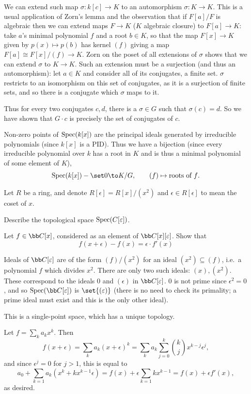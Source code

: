 We can extend such map $\sigma\colon k[c]\to K$ to an automorphism $\sigma\colon K\to K$.
This is a usual application of Zorn's lemma and the observation that if $F[a]/F$ is algebraic then we can extend maps
$F\to K$ ($K$ algebraic closure) to $F[a]\to K$: take $a$'s minimal polynomial $f$ and a root $b\in K$, so that
the map $F[x]\to K$ given by $p(x)\mapsto p(b)$ has kernel $(f)$ giving a map $F[a]\cong F[x]/(f)\to K$.
Zorn on the poset of all extensions of $\sigma$ shows that we can extend $\sigma$ to $K\to K$.
Such an extension must be a surjection (and thus an automorphism): let $a\in K$ and consider all of its conjugates,
a finite set.
$\sigma$ restricts to an isomorphism on this set of conjugates, as it is a surjection of finite sets, and so there is a
conjugate which $\sigma$ maps to it.

Thus for every two conjugates $c,d$, there is a $\sigma\in G$ such that $\sigma(c)=d$.
So we have shown that $G\cdot c$ is precisely the set of conjugates of $c$.

Non-zero points of ${\rm Spec}(k[x])$ are the principal ideals generated by irreducible polynomials (since $k[x]$ is a PID).
Thus we have a bijection (since every irreducible polynomial over $k$ has a root in $K$ and is thus a minimal polynomial
of some element of $K$),
$$ \spec(k[x])-\set0 \to K/G,\qquad (f)\mapsto\hbox{roots of $f$} . $$

\bprob

    Let $R$ be a ring, and denote $R[\epsilon]=R[x]/(x^2)$ and $\epsilon\in R[\epsilon]$ to mean the coset of $x$.
    \benum
        \item Describe the topological space ${\rm Spec}(C[\varepsilon])$.
        \item Let $f\in\bC[x]$, considered as an element of $\bC[x][\epsilon]$.
        Show that
        $$ f(x+\epsilon) - f(x) = \epsilon\cdot f'(x) $$
    \eenum

\eprob

\benum
    \item Ideals of $\bC[\epsilon]$ are of the form $(f)/(x^2)$ for an ideal $(x^2)\subseteq(f)$, i.e.\ a polynomial
    $f$ which divides $x^2$.
    There are only two such ideals: $(x),(x^2)$.
    These correspond to the ideals $0$ and $(\epsilon)$ in $\bC[\epsilon]$.
    $0$ is not prime since $\epsilon^2=0$, and so $\spec(\bC[\epsilon])$ is $\set{(\epsilon)}$ (there is no need to check
    its primality; a prime ideal must exist and this is the only other ideal).

    This is a single-point space, which has a unique topology.

    \item Let $f=\sum_ka_kx^k$.
    Then
    $$ f(x+\epsilon) = \sum_k a_k(x+\epsilon)^k = \sum_k a_k\sum_{j=0}^k\binom kj x^{k-j}\epsilon^j , $$
    and since $\epsilon^j=0$ for $j>1$, this is equal to
    $$ a_0 + \sum_{k=1}a_k(x^k+kx^{k-1}\epsilon) = f(x) + \epsilon\sum_{k=1}kx^{k-1} = f(x) + \epsilon f'(x) , $$
    as desired.
\eenum

\bye

